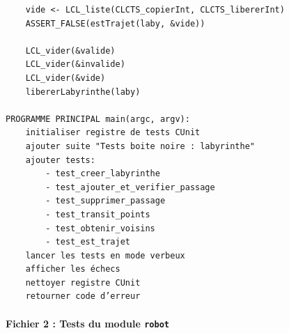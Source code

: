 \begin{verbatim}
    vide <- LCL_liste(CLCTS_copierInt, CLCTS_libererInt)
    ASSERT_FALSE(estTrajet(laby, &vide))

    LCL_vider(&valide)
    LCL_vider(&invalide)
    LCL_vider(&vide)
    libererLabyrinthe(laby)

PROGRAMME PRINCIPAL main(argc, argv):
    initialiser registre de tests CUnit
    ajouter suite "Tests boite noire : labyrinthe"
    ajouter tests:
        - test_creer_labyrinthe
        - test_ajouter_et_verifier_passage
        - test_supprimer_passage
        - test_transit_points
        - test_obtenir_voisins
        - test_est_trajet
    lancer les tests en mode verbeux
    afficher les échecs
    nettoyer registre CUnit
    retourner code d’erreur
\end{verbatim}



\paragraph{Fichier 2 : Tests du module \texttt{robot}}

